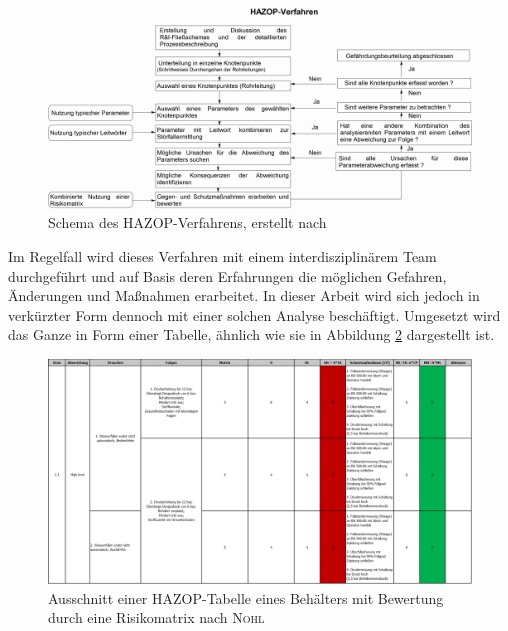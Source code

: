 \begin{figure}[h!]
	\centering
	\includegraphics[width=\textwidth]{img/hazop}
	\caption{Schema des HAZOP-Verfahrens, erstellt nach \cite{KenPatterson.2017, UlfSchubert.2020}}
	\label{fig:hazop}
\end{figure}
\FloatBarrier

Im Regelfall wird dieses Verfahren mit einem interdisziplinärem Team durchgeführt und auf Basis deren Erfahrungen die möglichen Gefahren, Änderungen und Maßnahmen erarbeitet. In dieser Arbeit wird sich jedoch in verkürzter Form dennoch mit einer solchen Analyse beschäftigt. Umgesetzt wird das Ganze in Form einer Tabelle, ähnlich wie sie in Abbildung \ref{fig:hazop_tabelle} dargestellt ist.

\begin{figure}[h!]
	\centering
	\includegraphics[width=\textwidth]{img/hazoptabelle}
	\caption{Ausschnitt einer HAZOP-Tabelle eines Behälters mit Bewertung durch eine Risikomatrix nach \textsc{Nohl}}
	\label{fig:hazop_tabelle}
\end{figure}
\FloatBarrier

